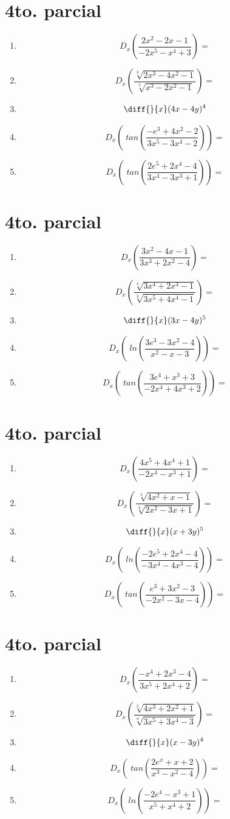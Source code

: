 \documentclass[oneside,spanish,letter]{article}
\begin{document}
\section{4to. parcial}
\begin{enumerate}
 \item $$ D_x \left( \frac{2x^2-2x-1}{-2x^5-x^4+3}\right)=$$
 \item $$ D_x \left( \frac{\sqrt[3]{2x^3-4x^2-1}}{\sqrt[5]{x^3-2x^2-1}}\right)=$$
\item $$\diff{}{x}(4x-4y)^4$$
 \item $$ D_x \left(\;tan\left( \frac{-e^3+4x^2-2}{3x^5-3x^4-2}\right)\right)=$$
 \item $$ D_x \left(\;tan\left( \frac{2e^5+2x^4-4}{3x^4-3x^3+1}\right)\right)=$$
 \end{enumerate}
  \newpage
\section{4to. parcial}
\begin{enumerate}
 \item $$ D_x \left( \frac{3x^2-4x-1}{3x^3+2x^2-4}\right)=$$
 \item $$ D_x \left( \frac{\sqrt[4]{3x^4+2x^3-1}}{\sqrt[3]{3x^5+4x^4-1}}\right)=$$
\item $$\diff{}{x}(3x-4y)^5$$
 \item $$ D_x \left(\;ln\left( \frac{3e^3-3x^2-4}{x^2-x-3}\right)\right)=$$
 \item $$ D_x \left(\;tan\left( \frac{3e^4+x^3+3}{-2x^4+4x^3+2}\right)\right)=$$
 \end{enumerate}
  \newpage
\section{4to. parcial}
\begin{enumerate}
 \item $$ D_x \left( \frac{4x^5+4x^4+1}{-2x^4-x^3+1}\right)=$$
 \item $$ D_x \left( \frac{\sqrt[5]{4x^2+x-1}}{\sqrt[3]{2x^2-3x+1}}\right)=$$
\item $$\diff{}{x}(x+3y)^5$$
 \item $$ D_x \left(\;ln\left( \frac{-2e^5+2x^4-4}{-3x^4-4x^3-4}\right)\right)=$$
 \item $$ D_x \left(\;tan\left( \frac{e^3+3x^2-3}{-2x^2-3x-4}\right)\right)=$$
 \end{enumerate}
  \newpage
\section{4to. parcial}
\begin{enumerate}
 \item $$ D_x \left( \frac{-x^4+2x^3-4}{3x^5+2x^4+2}\right)=$$
 \item $$ D_x \left( \frac{\sqrt[3]{4x^3+2x^2+1}}{\sqrt[4]{3x^5+3x^4-3}}\right)=$$
\item $$\diff{}{x}(x-3y)^4$$
 \item $$ D_x \left(\;tan\left( \frac{2e^x+x+2}{x^3-x^2-4}\right)\right)=$$
 \item $$ D_x \left(\;ln\left( \frac{-2e^4-x^3+1}{x^5+x^4+2}\right)\right)=$$
 \end{enumerate}
  \newpage
\end{document}
